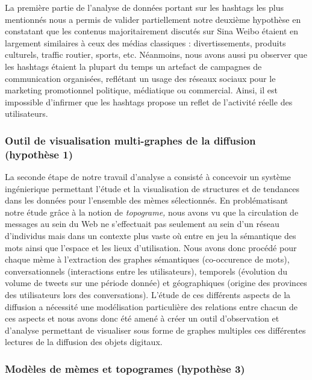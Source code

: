 La premi\`ere partie de l{\textquoteright}analyse de donn\'ees portant sur les hashtags les plus mentionn\'es nous a permis de valider partiellement notre deuxi\`eme hypoth\`ese en constatant que les contenus majoritairement discut\'es sur Sina Weibo \'etaient en largement similaires \`a ceux des m\'edias classiques : divertissements, produits culturels, traffic routier, sports, etc. N\'eanmoins, nous avons aussi pu observer que les hashtags \'etaient la plupart du temps un artefact de campagnes de communication organis\'ees, refl\'etant un usage des r\'eseaux sociaux pour le marketing promotionnel politique, m\'ediatique ou commercial. Ainsi, il est impossible d{\textquoteright}infirmer que les hashtags propose un reflet de l{\textquoteright}activit\'e r\'eelle des utilisateurs.

\subsubsection{Outil de visualisation multi-graphes de la diffusion (hypoth\`ese 1)} 

La seconde \'etape de notre travail d{\textquoteright}analyse a consist\'e \`a concevoir un syst\`eme ing\'enierique permettant l{\textquoteright}\'etude et la visualisation de structures et de tendances dans les donn\'ees pour l{\textquoteright}ensemble des m\`emes s\'electionn\'es. En probl\'ematisant notre \'etude gr\^ace \`a la notion de \textit{topograme,} nous avons vu que la circulation de messages au sein du Web ne s{\textquoteright}effectuait pas seulement au sein d{\textquoteright}un r\'eseau d{\textquoteright}individus mais dans un contexte plus vaste o\`u entre en jeu la s\'emantique des mots ainsi que l{\textquoteright}espace et les lieux d{\textquoteright}utilisation. Nous avons donc proc\'ed\'e pour chaque m\`eme \`a l{\textquoteright}extraction des graphes s\'emantiques (co-occurence de mots), conversationnels (interactions entre les utilisateurs), temporels (\'evolution du volume de tweets sur une p\'eriode donn\'ee) et g\'eographiques (origine des provinces des utilisateurs lors des conversations). L{\textquoteright}\'etude de ces diff\'erents aspects de la diffusion a n\'ecessit\'e une mod\'elisation particuli\`ere des relations entre chacun de ces aspects et nous avons donc \'et\'e amen\'e \`a cr\'eer un outil d{\textquoteright}observation et d{\textquoteright}analyse permettant de visualiser sous forme de graphes multiples ces diff\'erentes lectures de la diffusion des objets digitaux.  
  
\subsubsection{Mod\`eles de m\`emes et topogrames (hypoth\`ese 3)}
 

